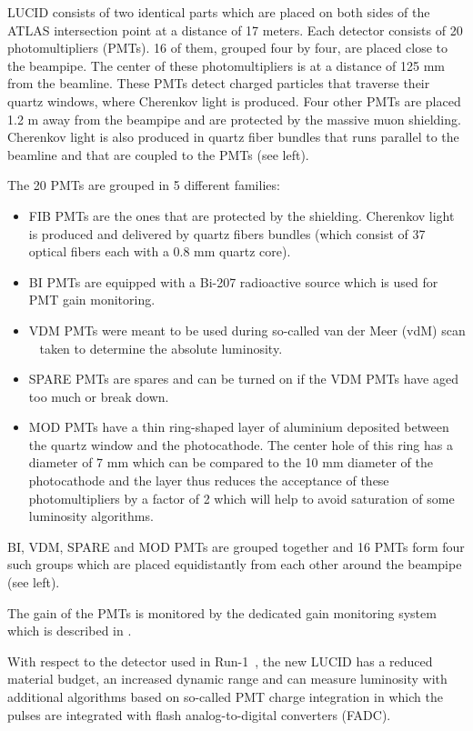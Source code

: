 LUCID consists of two identical parts which are placed on both sides of the ATLAS intersection point at a distance of 17 meters.
Each detector consists of 20 photomultipliers (PMTs).
16 of them, grouped four by four, are placed close to the beampipe. The center of these photomultipliers is at a distance of 125 mm from the beamline.
These PMTs detect charged particles that traverse their quartz windows, where Cherenkov light is produced.
Four other PMTs are placed 1.2 m away from the beampipe and are protected by the massive muon shielding.
Cherenkov light is also produced in quartz fiber bundles that runs parallel to the beamline and that are coupled to the PMTs (see  left).

The 20 PMTs are grouped in 5 different families:
\begin{itemize}
 \item FIB PMTs are the ones that are protected by the shielding. Cherenkov light is produced and delivered by quartz fibers bundles 
 (which consist of 37 optical fibers each with a 0.8 mm quartz core).
 \item BI PMTs are equipped with a Bi-207 radioactive source which is used for PMT gain monitoring. 
 \item VDM PMTs were meant to be used during so-called van der Meer (vdM) scan ~\cite{vanderMeer:296752,Rubbia:1025746} taken to determine the absolute luminosity.
 \item SPARE PMTs are spares and can be turned on if the VDM PMTs have aged too much or break down.
 \item MOD PMTs have a thin ring-shaped layer of aluminium deposited between the quartz window and the photocathode. 
 The center hole of this ring has a diameter of 7 mm which can be compared to the 10 mm diameter of the photocathode 
 and the layer thus reduces the acceptance of these photomultipliers by a factor of 2 which will help to avoid saturation of some luminosity algorithms.
\end{itemize}

BI, VDM, SPARE and MOD PMTs are grouped together and 16 PMTs form four such groups which are placed equidistantly from each other around the beampipe (see  left).

The gain of the PMTs is monitored by the dedicated gain monitoring system which is described in .

With respect to the detector used in Run-1~\cite{Aad:2013ucp}, the new LUCID has a reduced material budget, 
an increased dynamic range and can measure luminosity with additional algorithms based on so-called PMT charge integration in which the pulses are integrated with 
flash analog-to-digital converters (FADC).

